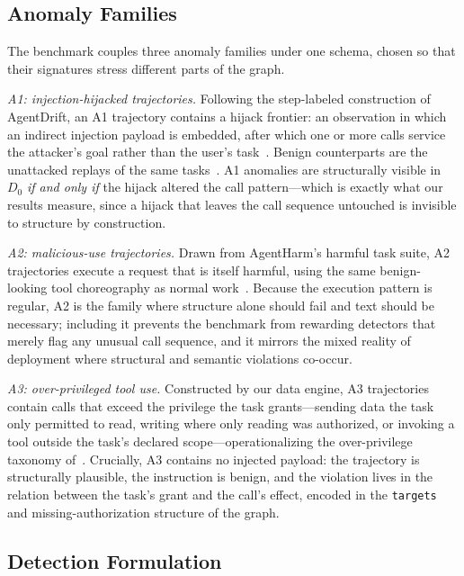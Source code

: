 \subsection{Anomaly Families}
\label{sec:method-families}

The benchmark couples three anomaly families under one schema, chosen so that their signatures stress different parts of the graph.

\emph{A1: injection-hijacked trajectories.} Following the step-labeled construction of AgentDrift, an A1 trajectory contains a hijack frontier: an observation in which an indirect injection payload is embedded, after which one or more calls service the attacker's goal rather than the user's task~\cite{pinjari2026agentdrift}. Benign counterparts are the unattacked replays of the same tasks~\cite{debenedetti2024agentdojo}. A1 anomalies are structurally visible in $D_0$ \emph{if and only if} the hijack altered the call pattern---which is exactly what our results measure, since a hijack that leaves the call sequence untouched is invisible to structure by construction.

\emph{A2: malicious-use trajectories.} Drawn from AgentHarm's harmful task suite, A2 trajectories execute a request that is itself harmful, using the same benign-looking tool choreography as normal work~\cite{andriushchenko2024agentharm}. Because the execution pattern is regular, A2 is the family where structure alone should fail and text should be necessary; including it prevents the benchmark from rewarding detectors that merely flag any unusual call sequence, and it mirrors the mixed reality of deployment where structural and semantic violations co-occur.

\emph{A3: over-privileged tool use.} Constructed by our data engine, A3 trajectories contain calls that exceed the privilege the task grants---sending data the task only permitted to read, writing where only reading was authorized, or invoking a tool outside the task's declared scope---operationalizing the over-privilege taxonomy of~\cite{yang2026when}. Crucially, A3 contains no injected payload: the trajectory is structurally plausible, the instruction is benign, and the violation lives in the relation between the task's grant and the call's effect, encoded in the \texttt{targets} and missing-authorization structure of the graph.

\subsection{Detection Formulation}
\label{sec:method-detection}


